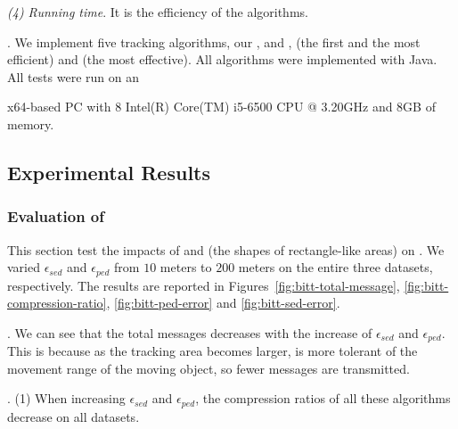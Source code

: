  \ni \emph{(4) Running time}. It is the efficiency of the algorithms.
 
.
We implement five tracking algorithms, \ie our \citt, \sitt and \bitt, \ldrh (the first and the most efficient) and \grts (the most effective).
All algorithms were implemented with Java.
All tests were run on an {x64-based  PC with 8 Intel(R) Core(TM) i5-6500 CPU @ 3.20GHz and 8GB of memory.


\subsection{Experimental Results}


\subsubsection{Evaluation of~ \bitt}
This section test the impacts of \ped and \sed (\ie the shapes of rectangle-like areas) on \bitt. We varied $\epsilon_{sed}$ and $\epsilon_{ped}$ from $10$ meters to $200$ meters on the entire three datasets, respectively. The results are reported in Figures~\ref{fig:bitt-total-message}, \ref{fig:bitt-compression-ratio}, \ref{fig:bitt-ped-error} and \ref{fig:bitt-sed-error}.

.
We can see that the total messages decreases with the increase of $\epsilon_{sed}$ and $\epsilon_{ped}$. This is because as the tracking area becomes larger, \bitt is more tolerant of the movement range of the moving object, so fewer messages are transmitted.

.
\ni (1) When increasing $\epsilon_{sed}$ and $\epsilon_{ped}$, the compression ratios of all these algorithms decrease on all datasets.




}
